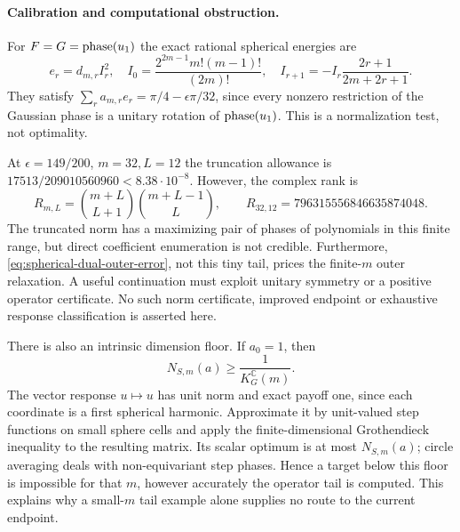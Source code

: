 \paragraph{Calibration and computational obstruction.}
For $F=G=\operatorname{phase}(u_1)$ the exact rational spherical energies are
\[
 e_r=d_{m,r}I_r^2,\quad
 I_0=\frac{2^{2m-1}m!(m-1)!}{(2m)!},\quad
 I_{r+1}=-I_r\frac{2r+1}{2m+2r+1}.
\]
They satisfy $\sum_ra_{m,r}e_r=\pi/4-\epsilon\pi/32$,
since every nonzero restriction of the Gaussian phase is a unitary
rotation of $\operatorname{phase}(u_1)$. This is a normalization test, not optimality.

At $\epsilon=149/200$, $m=32,L=12$ the truncation allowance is
$17513/209010560960<8.38\cdot10^{-8}$. However, the complex rank is
\[
 R_{m,L}=\binom{m+L}{L+1}\binom{m+L-1}{L},\qquad
 R_{32,12}=796315556846635874048.
\]
The truncated norm has a maximizing pair of phases of polynomials in
this finite range, but direct coefficient enumeration is not credible.
Furthermore, \eqref{eq:spherical-dual-outer-error}, not this tiny tail,
prices the finite-$m$ outer relaxation. A useful continuation must
exploit unitary symmetry or a positive operator certificate. No such
norm certificate, improved endpoint or exhaustive response
classification is asserted here.

There is also an intrinsic dimension floor. If $a_0=1$, then
\[
 N_{S,m}(a)\ge\frac1{K_G^{\mathbb C}(m)}.
\]
The vector response $u\mapsto u$ has unit norm and exact payoff one,
since each coordinate is a first spherical harmonic. Approximate it
by unit-valued step functions on small sphere cells and apply the
finite-dimensional Grothendieck inequality to the resulting matrix.
Its scalar optimum is at most $N_{S,m}(a)$; circle averaging deals
with non-equivariant step phases. Hence a target below this floor is
impossible for that $m$, however accurately the operator tail is
computed. This explains why a small-$m$ tail example alone supplies
no route to the current endpoint.


